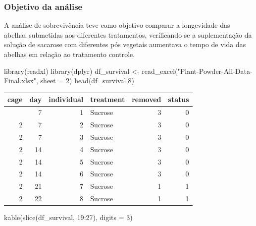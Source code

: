 \documentclass[
  brazilian,
  12pt,
  a4paper,
]{article}
\newenvironment{Shaded}{\begin{snugshade}}{\end{snugshade}}
\newcommand{\AttributeTok}[1]{\textcolor[rgb]{0.40,0.45,0.13}{#1}}
\newcommand{\DecValTok}[1]{\textcolor[rgb]{0.68,0.00,0.00}{#1}}
\newcommand{\FunctionTok}[1]{\textcolor[rgb]{0.28,0.35,0.67}{#1}}
\newcommand{\NormalTok}[1]{\textcolor[rgb]{0.00,0.46,0.62}{#1}}
\newcommand{\OtherTok}[1]{\textcolor[rgb]{0.00,0.46,0.62}{#1}}
\newcommand{\SpecialCharTok}[1]{\textcolor[rgb]{0.37,0.37,0.37}{#1}}
\newcommand{\StringTok}[1]{\textcolor[rgb]{0.13,0.47,0.30}{#1}}
\begin{document}
\subsubsection{Objetivo da análise}

A análise de sobrevivência teve como objetivo comparar a longevidade das
abelhas submetidas aos diferentes tratamentos, verificando se a
suplementação da solução de sacarose com diferentes pós vegetais
aumentava o tempo de vida das abelhas em relação ao tratamento controle.

\begin{Shaded}
\begin{Highlighting}[]
\FunctionTok{library}\NormalTok{(readxl)}
\FunctionTok{library}\NormalTok{(dplyr)}
\NormalTok{df\_survival }\OtherTok{\textless{}{-}} \FunctionTok{read\_excel}\NormalTok{(}\StringTok{"Plant{-}Powder{-}All{-}Data{-}Final.xlsx"}\NormalTok{, }\AttributeTok{sheet =} \DecValTok{2}\NormalTok{)}
\FunctionTok{head}\NormalTok{(df\_survival,}\DecValTok{8}\NormalTok{)}
\end{Highlighting}
\end{Shaded}

\begin{longtable}[]{@{}rrrlrr@{}}
\toprule\noalign{}
cage & day & individual & treatment & removed & status \\
\midrule\noalign{}
\endhead
\bottomrule\noalign{}
\endlastfoot
2 & 7 & 1 & Sucrose & 3 & 0 \\
2 & 7 & 2 & Sucrose & 3 & 0 \\
2 & 7 & 3 & Sucrose & 3 & 0 \\
2 & 14 & 4 & Sucrose & 3 & 0 \\
2 & 14 & 5 & Sucrose & 3 & 0 \\
2 & 14 & 6 & Sucrose & 3 & 0 \\
2 & 21 & 7 & Sucrose & 1 & 1 \\
2 & 22 & 8 & Sucrose & 1 & 1 \\
\end{longtable}

\begin{Shaded}
\begin{Highlighting}[]
\FunctionTok{kable}\NormalTok{(}\FunctionTok{slice}\NormalTok{(df\_survival, }\DecValTok{19}\SpecialCharTok{:}\DecValTok{27}\NormalTok{), }\AttributeTok{digits =} \DecValTok{3}\NormalTok{)}
\end{Highlighting}
\end{Shaded}
\end{document}

